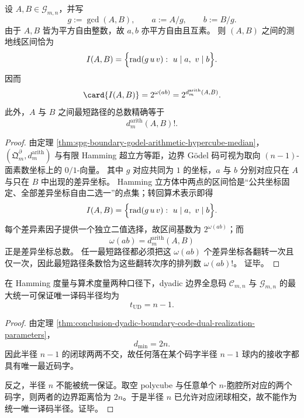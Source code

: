 \begin{theorem}\label{thm:conclusion-dyadic-boundary-code-interval-geometry-geodesic-count}
设 \(A,B\in \mathcal G_{m,n}\)，并写
\[
g:=\gcd(A,B),\qquad a:=A/g,\qquad b:=B/g.
\]
由于 \(A,B\) 皆为平方自由整数，故 \(a,b\) 亦平方自由且互素。
则 \((A,B)\) 之间的测地线区间恰为
\[
I(A,B)
=
\Bigl\{\operatorname{rad}(g\,u\,v):\ u\mid a,\ v\mid b\Bigr\}.
\]
因而
\[
\card{I(A,B)}=2^{\omega(ab)}=2^{d_m^{\mathrm{arith}}(A,B)}.
\]
此外，\(A\) 与 \(B\) 之间最短路径的总数精确等于
\[
d_m^{\mathrm{arith}}(A,B)!.
\]
\end{theorem}
\begin{proof}
由定理 \ref{thm:spg-boundary-godel-arithmetic-hypercube-median}，\((\mathfrak Q_m^\partial,d_m^{\mathrm{arith}})\) 与有限 Hamming 超立方等距，边界 Gödel 码可视为取向 \((n-1)\)-面素数坐标上的 \(0/1\)-向量。
其中 \(g\) 对应共同为 \(1\) 的坐标，\(a\) 与 \(b\) 分别对应只在 \(A\) 与只在 \(B\) 中出现的差异坐标。
Hamming 立方体中两点的区间恰是“公共坐标固定、全部差异坐标自由二选一”的点集；转回算术表示即得
\[
I(A,B)=\Bigl\{\operatorname{rad}(g\,u\,v):\ u\mid a,\ v\mid b\Bigr\}.
\]
每个差异素因子提供一个独立二值选择，故区间基数为 \(2^{\omega(ab)}\)；而
\[
\omega(ab)=d_m^{\mathrm{arith}}(A,B)
\]
正是差异坐标总数。
任一最短路径都必须把这 \(\omega(ab)\) 个差异坐标各翻转一次且仅一次，因此最短路径条数恰为这些翻转次序的排列数
\(
\omega(ab)!
\)。
证毕。
\end{proof}

\begin{corollary}[分辨率无关的唯一译码半径]\label{cor:conclusion-dyadic-boundary-code-uniform-unique-decoding-radius}
在 Hamming 度量与算术度量两种口径下，dyadic 边界全息码 \(\mathcal C_{m,n}\) 与 \(\mathcal G_{m,n}\) 的最大统一可保证唯一译码半径均为
\[
t_{\mathrm{UD}}=n-1.
\]
\end{corollary}
\begin{proof}
由定理 \ref{thm:conclusion-dyadic-boundary-code-dual-realization-parameters}，
\[
d_{\min}=2n.
\]
因此半径 \(n-1\) 的闭球两两不交，故任何落在某个码字半径 \(n-1\) 球内的接收字都具有唯一最近码字。

反之，半径 \(n\) 不能被统一保证。取空 polycube 与任意单个 \(n\)-胞腔所对应的两个码字，则两者的边界距离恰为 \(2n\)。于是半径 \(n\) 已允许对应闭球相交，故不能作为统一唯一译码半径。证毕。
\end{proof}

